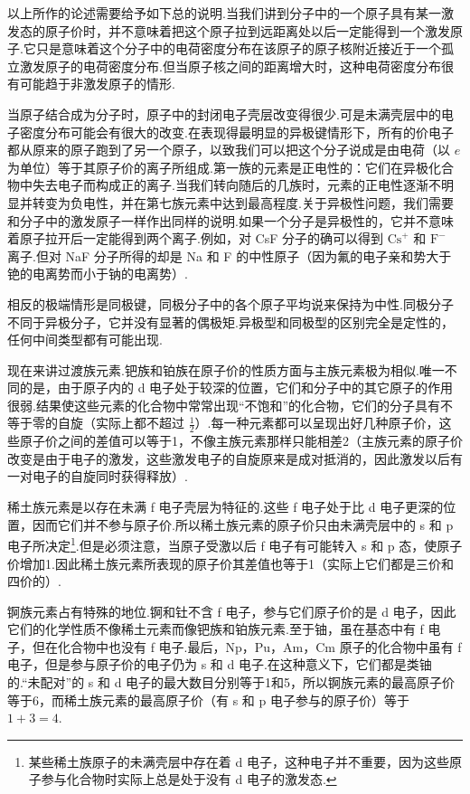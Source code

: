 以上所作的论述需要给予如下总的说明.当我们讲到分子中的一个原子具有某一激发态的原子价时，并不意味着把这个原子拉到远距离处以后一定能得到一个激发原子.它只是意味着这个分子中的电荷密度分布在该原子的原子核附近接近于一个孤立激发原子的电荷密度分布.但当原子核之间的距离增大时，这种电荷密度分布很有可能趋于非激发原子的情形.

当原子结合成为分子时，原子中的封闭电子壳层改变得很少.可是未满壳层中的电子密度分布可能会有很大的改变.在表现得最明显的异极键情形下，所有的价电子都从原来的原子跑到了另一个原子，以致我们可以把这个分子说成是由电荷（以 $e$ 为单位）等于其原子价的离子所组成.第一族的元素是正电性的：它们在异极化合物中失去电子而构成正的离子.当我们转向随后的几族时，元素的正电性逐渐不明显并转变为负电性，并在第七族元素中达到最高程度.关于异极性问题，我们需要和分子中的激发原子一样作出同样的说明.如果一个分子是异极性的，它并不意味着原子拉开后一定能得到两个离子.例如，对 CsF 分子的确可以得到 $\mathrm{Cs}^+$ 和 $\mathrm{F}^-$ 离子.但对 NaF 分子所得的却是 Na 和 F 的中性原子（因为氟的电子亲和势大于铯的电离势而小于钠的电离势）.

相反的极端情形是同极键，同极分子中的各个原子平均说来保持为中性.同极分子不同于异极分子，它并没有显著的偶极矩.异极型和同极型的区别完全是定性的，任何中间类型都有可能出现.

现在来讲过渡族元素.钯族和铂族在原子价的性质方面与主族元素极为相似.唯一不同的是，由于原子内的 d 电子处于较深的位置，它们和分子中的其它原子的作用很弱.结果使这些元素的化合物中常常出现“不饱和”的化合物，它们的分子具有不等于零的自旋（实际上都不超过 $\frac{1}{2}$）.每一种元素都可以呈现出好几种原子价，这些原子价之间的差值可以等于1，不像主族元素那样只能相差2（主族元素的原子价改变是由于电子的激发，这些激发电子的自旋原来是成对抵消的，因此激发以后有一对电子的自旋同时获得释放）.

稀土族元素是以存在未满 f 电子壳层为特征的.这些 f 电子处于比 d 电子更深的位置，因而它们并不参与原子价.所以稀土族元素的原子价只由未满壳层中的 s 和 p 电子所决定\footnote{某些稀土族原子的未满壳层中存在着 d 电子，这种电子并不重要，因为这些原子参与化合物时实际上总是处于没有 d 电子的激发态.}.但是必须注意，当原子受激以后 f 电子有可能转入 s 和 p 态，使原子价增加1.因此稀土族元素所表现的原子价其差值也等于1（实际上它们都是三价和四价的）.

锕族元素占有特殊的地位.锕和钍不含 f 电子，参与它们原子价的是 d 电子，因此它们的化学性质不像稀土元素而像钯族和铂族元素.至于铀，虽在基态中有 f 电子，但在化合物中也没有 f 电子.最后，Np，Pu，Am，Cm 原子的化合物中虽有 f 电子，但是参与原子价的电子仍为 s 和 d 电子.在这种意义下，它们都是类铀的.“未配对”的 s 和 d 电子的最大数目分别等于1和5，所以锕族元素的最高原子价等于6，而稀土族元素的最高原子价（有 s 和 p 电子参与的原子价）等于 $1+3=4$.

